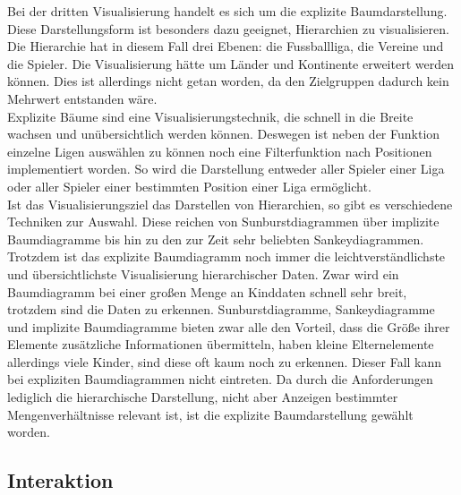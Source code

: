 \documentclass[usegeometry=true]{scrartcl}
\begin{document}
Bei der dritten Visualisierung handelt es sich um die explizite Baumdarstellung. Diese Darstellungsform ist besonders dazu geeignet, Hierarchien zu visualisieren. 
Die Hierarchie hat in diesem Fall drei Ebenen: die Fussballliga, die Vereine und die Spieler.
Die Visualisierung hätte um Länder und Kontinente erweitert werden können. Dies ist allerdings nicht getan worden, da den Zielgruppen dadurch kein Mehrwert entstanden wäre.\\
Explizite Bäume sind eine Visualisierungstechnik, die schnell in die Breite wachsen und unübersichtlich werden können. Deswegen ist neben der Funktion einzelne Ligen auswählen zu können noch eine Filterfunktion nach Positionen implementiert worden. So wird die Darstellung entweder aller Spieler einer Liga oder aller Spieler einer bestimmten Position einer Liga ermöglicht.\\
Ist das Visualisierungsziel das Darstellen von Hierarchien, so gibt es verschiedene Techniken zur Auswahl. Diese reichen von Sunburstdiagrammen über implizite Baumdiagramme bis hin zu den zur Zeit sehr beliebten Sankeydiagrammen. Trotzdem ist das explizite Baumdiagramm noch immer die leichtverständlichste und übersichtlichste Visualisierung hierarchischer Daten. Zwar wird ein Baumdiagramm bei einer großen Menge an Kinddaten schnell sehr breit, trotzdem sind die Daten zu erkennen. Sunburstdiagramme, Sankeydiagramme und implizite Baumdiagramme bieten zwar alle den Vorteil, dass die Größe ihrer Elemente zusätzliche Informationen übermitteln, haben kleine Elternelemente allerdings viele Kinder, sind diese oft kaum noch zu erkennen. Dieser Fall kann bei expliziten Baumdiagrammen nicht eintreten. Da durch die Anforderungen lediglich die hierarchische Darstellung, nicht aber Anzeigen bestimmter Mengenverhältnisse relevant ist, ist die explizite Baumdarstellung gewählt worden.

\subsection{Interaktion}

\end{document}
